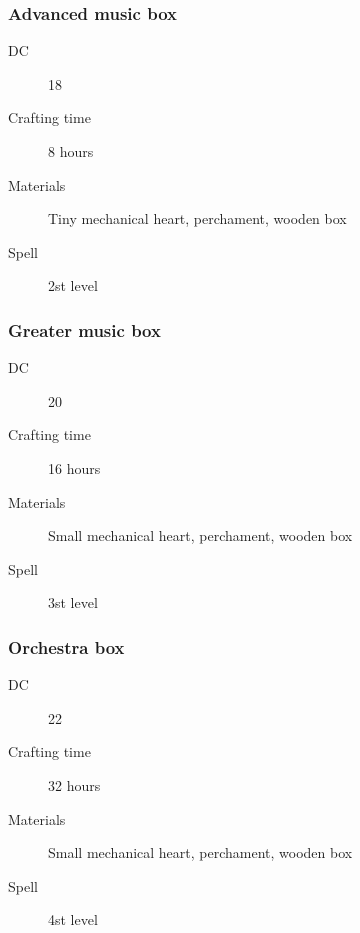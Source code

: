 \subsubsection{Advanced music box}

\begin{description}
\item [DC] 18
\item [Crafting time] 8 hours
\item [Materials] Tiny mechanical heart, perchament, wooden box
\item [Spell] 2st level
\end{description}

\subsubsection{Greater music box}

\begin{description}
\item [DC] 20
\item [Crafting time] 16 hours
\item [Materials] Small mechanical heart, perchament, wooden box
\item [Spell] 3st level
\end{description}

\subsubsection{Orchestra box}

\begin{description}
\item [DC] 22
\item [Crafting time] 32 hours
\item [Materials] Small mechanical heart, perchament, wooden box
\item [Spell] 4st level
\end{description}